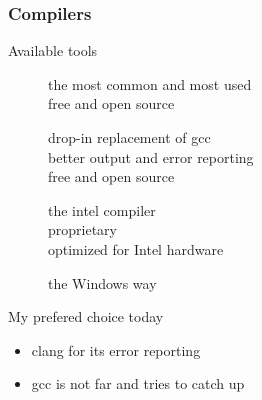 \begin{frame}[fragile]
  \frametitle{Compilers}
  \begin{block}{Available tools}
    \begin{description}
    \item[\href{http://gcc.gnu.org/}{}]
        the most common and most used\\
        free and open source
    \item[\href{http://clang.llvm.org/}{}]
        drop-in replacement of gcc \\
        better output and error reporting \\
        free and open source
    \item[\href{http://software.intel.com/en-us/intel-compilers}{}]
        the intel compiler \\
        proprietary \\
        optimized for Intel hardware
    \item[\href{http://www.microsoft.com/}{}]
      the Windows way
    \end{description}
  \end{block}
  \begin{alertblock}{My prefered choice today}
    \begin{itemize}
      \item \alert{clang} for its error reporting
      \item \alert{gcc} is not far and tries to catch up
    \end{itemize}
  \end{alertblock}
\end{frame}

